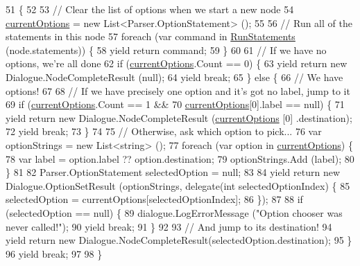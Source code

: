 \begin{DoxyCode}
51         \{
52 
53             \textcolor{comment}{// Clear the list of options when we start a new node}
54             \hyperlink{a00083_a1ff25426f4da4236acc741bbbb8c0d56}{currentOptions} = \textcolor{keyword}{new} List<Parser.OptionStatement> ();
55 
56             \textcolor{comment}{// Run all of the statements in this node}
57             \textcolor{keywordflow}{foreach} (var command \textcolor{keywordflow}{in} \hyperlink{a00083_aa436557ec45c8e98d194d9af139d9170}{RunStatements} (node.statements)) \{
58                 yield \textcolor{keywordflow}{return} command;
59             \}
60 
61             \textcolor{comment}{// If we have no options, we're all done}
62             \textcolor{keywordflow}{if} (\hyperlink{a00083_a1ff25426f4da4236acc741bbbb8c0d56}{currentOptions}.Count == 0) \{
63                 yield \textcolor{keywordflow}{return} \textcolor{keyword}{new} Dialogue.NodeCompleteResult (null);
64                 yield \textcolor{keywordflow}{break};
65             \} \textcolor{keywordflow}{else} \{
66                 \textcolor{comment}{// We have options!}
67 
68                 \textcolor{comment}{// If we have precisely one option and it's got no label, jump to it}
69                 \textcolor{keywordflow}{if} (\hyperlink{a00083_a1ff25426f4da4236acc741bbbb8c0d56}{currentOptions}.Count == 1 &&
70                     \hyperlink{a00083_a1ff25426f4da4236acc741bbbb8c0d56}{currentOptions}[0].label == null) \{
71                     yield \textcolor{keywordflow}{return} \textcolor{keyword}{new} Dialogue.NodeCompleteResult (\hyperlink{a00083_a1ff25426f4da4236acc741bbbb8c0d56}{currentOptions} [0]
      .destination);
72                     yield \textcolor{keywordflow}{break};
73                 \}
74 
75                 \textcolor{comment}{// Otherwise, ask which option to pick...}
76                 var optionStrings = \textcolor{keyword}{new} List<string> ();
77                 \textcolor{keywordflow}{foreach} (var option \textcolor{keywordflow}{in} \hyperlink{a00083_a1ff25426f4da4236acc741bbbb8c0d56}{currentOptions}) \{
78                     var label = option.label ?? option.destination;
79                     optionStrings.Add (label);
80                 \}
81 
82                 Parser.OptionStatement selectedOption = null;
83 
84                 yield \textcolor{keywordflow}{return} \textcolor{keyword}{new} Dialogue.OptionSetResult (optionStrings, delegate(\textcolor{keywordtype}{int} selectedOptionIndex)
       \{
85                     selectedOption = currentOptions[selectedOptionIndex];
86                 \});
87 
88                 \textcolor{keywordflow}{if} (selectedOption == null) \{
89                     dialogue.LogErrorMessage (\textcolor{stringliteral}{"Option chooser was never called!"});
90                     yield \textcolor{keywordflow}{break};
91                 \}
92 
93                 \textcolor{comment}{// And jump to its destination!}
94                 yield \textcolor{keywordflow}{return} \textcolor{keyword}{new} Dialogue.NodeCompleteResult(selectedOption.destination);
95             \}
96             yield \textcolor{keywordflow}{break};
97 
98         \}
\end{DoxyCode}
